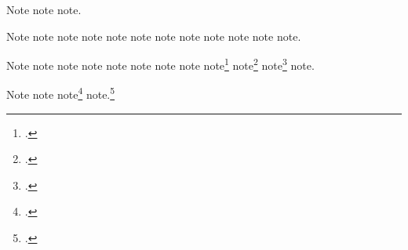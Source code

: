\documentclass[a4paper,12pt]{report}
\begin{document}
Note\autocite{verdi:corsaro} note\autocite{wauchope:ceramics}
note\autocite{weed:flatiron}.


Note\autocite{weresz} note\autocite{white:callimachus}
note\autocite{white:ross:memo} note\autocite{warr:ellison}
note\autocite{weed:flatiron} note\autocite{wikiped:bibtex}
note\autocite{will:cohere} note\autocite{wauchope:ceramics}
note\autocite{zukowsky:chicago} note\autocite{weresz}
note\autocite{white:russ} note\autocite{white:callimachus}.

Note\autocite{white:ross:memo} note\autocite{white:russ}
note\autocite[BibTeX]{wikiped:bibtex} note\autocite{will:cohere}
note\autocite{zukowsky:chicago}
note\autocites[See][3.2.996b5--8]{aristotle:metaphy:gr}[360e--361b]
{plato:republic:gr}[and also][for additional
information]{white:callimachus} note\autocite{aristotle:metaphy:trans}
note\autocites[See][]{mchugh:wake}[and][569]{warr:ellison}
note\footnote{.}
note\footnote{.}
note\footnote{.}
note\autocite[3:126]{meredith:letters}.

Note note\autocite[2]{weresz}
note\footnote{.}
note.\footnote{\cite*{zukowsky:chicago}.}

\nocite{furet:passing:fr,good:wholeissue,house:papers,frede:inproc}

\printshorthands

\printbibliography[notkeyword=original]
\end{document}
